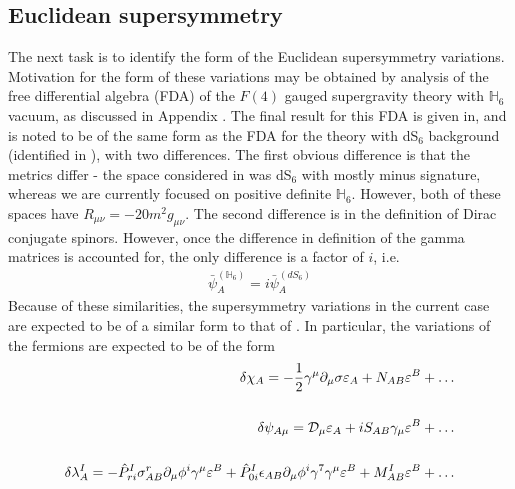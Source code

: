 \documentclass[12pt]{article}
\begin{document}
\subsection{Euclidean supersymmetry}
The next task is to identify the form of the Euclidean supersymmetry variations. Motivation for the form of these variations may be obtained by analysis of the free differential algebra (FDA) of the $F(4)$ gauged supergravity theory with $\mathbb{H}_6$ vacuum, as discussed in Appendix . The final result for this FDA is given in, and is noted to be of the same form as the FDA for the theory with dS$_6$ background (identified in ), with two differences. The first obvious difference is that the metrics differ - the space considered in  was dS$_6$ with mostly minus signature, whereas we are currently focused on positive definite $\mathbb{H}_6$. However, both of these spaces have $R_{\mu\nu} = - 20 m^2 g_{\mu\nu}$. The second difference is in the definition of Dirac conjugate spinors. However, once the difference in definition of the gamma matrices is accounted for, the only difference is a factor of $i$, i.e.
\begin{eqnarray}
\bar \psi_A^{(\mathbb{H}_6)} =  i \bar \psi_A^{(dS_6)} 
\end{eqnarray}
Because of these similarities, the supersymmetry variations in the current case are expected to be of a similar form to that of . In particular, the variations of the fermions are expected to be of the form
\begin{eqnarray}
\delta \chi_A = - {1\over 2} \gamma^\mu \partial_\mu \sigma \varepsilon_A + N_{AB} \varepsilon^B + \dots
\nonumber\\\nonumber\\
\delta \psi_{A \mu} = {\cal D}_\mu \varepsilon_A + i S_{AB} \gamma_\mu \varepsilon^B +\dots
\nonumber\\\nonumber\\
\delta \lambda^I_A = - \hat P^I_{r i} \sigma^r_{AB} \partial_\mu \phi^i \gamma^\mu \varepsilon^B + \hat P^I_{0 i} \epsilon_{AB} \partial_\mu \phi^i \gamma^7 \gamma^\mu \varepsilon^B + M^I_{AB} \varepsilon^B+\dots
\end{eqnarray}
\end{document}
